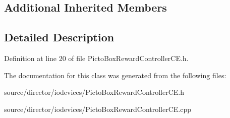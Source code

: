 \subsection*{Additional Inherited Members}


\subsection{Detailed Description}


Definition at line 20 of file Picto\-Box\-Reward\-Controller\-C\-E.\-h.



The documentation for this class was generated from the following files\-:\begin{DoxyCompactItemize}
\item 
source/director/iodevices/Picto\-Box\-Reward\-Controller\-C\-E.\-h\item 
source/director/iodevices/Picto\-Box\-Reward\-Controller\-C\-E.\-cpp\end{DoxyCompactItemize}
